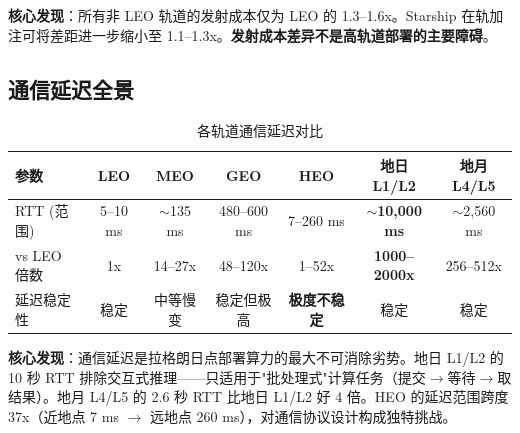 \textbf{核心发现}：所有非 LEO 轨道的发射成本仅为 LEO 的 1.3--1.6x。Starship 在轨加注可将差距进一步缩小至 1.1--1.3x。\textbf{发射成本差异不是高轨道部署的主要障碍}。

\subsection{通信延迟全景}

\begin{table}[H]
\centering
\caption{各轨道通信延迟对比}
\label{tab:latency-overview}
\small
\begin{tabular}{@{}lcccccc@{}}
\toprule
\textbf{参数} & \textbf{LEO} & \textbf{MEO} & \textbf{GEO} & \textbf{HEO} & \textbf{地日L1/L2} & \textbf{地月L4/L5} \\
\midrule
RTT (范围) & 5--10 ms & $\sim$135 ms & 480--600 ms & 7--260 ms & \textbf{$\sim$10,000 ms} & $\sim$2,560 ms \\
vs LEO 倍数 & 1x & 14--27x & 48--120x & 1--52x & \textbf{1000--2000x} & 256--512x \\
延迟稳定性 & 稳定 & 中等慢变 & 稳定但极高 & \textbf{极度不稳定} & 稳定 & 稳定 \\
\bottomrule
\end{tabular}
\end{table}

\textbf{核心发现}：通信延迟是拉格朗日点部署算力的最大不可消除劣势。地日 L1/L2 的 10 秒 RTT 排除交互式推理——只适用于"批处理式"计算任务（提交$\rightarrow$等待$\rightarrow$取结果）。地月 L4/L5 的 2.6 秒 RTT 比地日 L1/L2 好 4 倍。HEO 的延迟范围跨度 37x（近地点 7 ms $\rightarrow$ 远地点 260 ms），对通信协议设计构成独特挑战。
